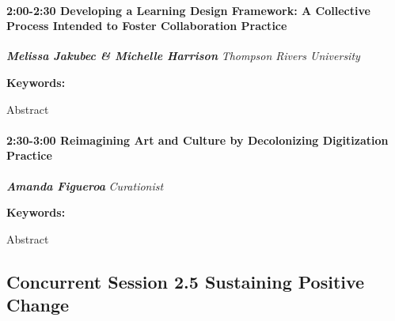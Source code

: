 \documentclass[
]{book}
\begin{document}
\begin{session}
\hypertarget{developing-a-learning-design-framework-a-collective-process-intended-to-foster-collaboration-practice}{%
\paragraph*{\texorpdfstring{2:00-2:30 \textbar{} \textbf{Developing a
Learning Design Framework: A Collective Process Intended to Foster
Collaboration} \textbar{}
Practice}{2:00-2:30 \textbar{} Developing a Learning Design Framework: A Collective Process Intended to Foster Collaboration \textbar{} Practice}}\label{developing-a-learning-design-framework-a-collective-process-intended-to-foster-collaboration-practice}}

\textbf{\emph{Melissa Jakubec \& Michelle Harrison}} \textbar{}
\emph{Thompson Rivers University}

\textbf{Keywords:}

Abstract
\end{session}

\begin{session}
\hypertarget{reimagining-art-and-culture-by-decolonizing-digitization-practice}{%
\paragraph*{\texorpdfstring{2:30-3:00 \textbar{} \textbf{Reimagining Art
and Culture by Decolonizing Digitization} \textbar{}
Practice}{2:30-3:00 \textbar{} Reimagining Art and Culture by Decolonizing Digitization \textbar{} Practice}}\label{reimagining-art-and-culture-by-decolonizing-digitization-practice}}

\textbf{\emph{Amanda Figueroa}} \textbar{} \emph{Curationist}

\textbf{Keywords:}

Abstract
\end{session}

\hypertarget{concurrent-session-2.5-sustaining-positive-change}{%
\subsection*{Concurrent Session 2.5 \textbar{} Sustaining Positive Change}\label{concurrent-session-2.5-sustaining-positive-change}}
\end{document}
